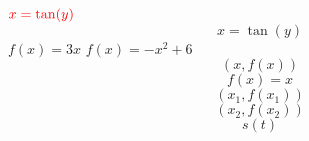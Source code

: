 \documentclass{article}
\begin{document}
$\textcolor{red}{x=\tan(y)}$
$$x=\tan(y)$$
$f(x)=3x$
$f(x)=-x^2+6$
$$(x,f(x))$$
$$f(x)=x$$
$$\left(x_1,f(x_1)\right)$$
$$(x_2,f(x_2))$$
$$s(t)$$
\end{document}
